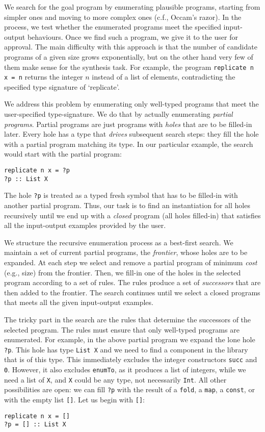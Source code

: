 We search for the goal program by enumerating plausible programs, starting from simpler ones and moving to more complex ones (c.f., Occam's razor).  In the process, we test whether the enumerated programs meet the specified input-output behaviours.  Once we find such a program, we give it to the user for approval.  The main difficulty with this approach is that the number of candidate programs of a given size grows exponentially, but on the other hand very few of them make sense for the synthesis task.  For example, the program \lstinline|replicate n x = n| returns the integer $n$ instead of a list of elements, contradicting the specified type signature of `replicate'.

We address this problem by enumerating only well-typed programs that meet the user-specified type-signature.  We do that by actually enumerating \emph{partial programs}.  Partial programs are just programs with \emph{holes} that are to be filled-in later.  Every hole has a type that \emph{drives} subsequent search steps: they fill the hole with a partial program matching its type.  In our particular example, the search would start with the partial program:
\begin{lstlisting}[style=plain]
replicate n x = ?p
?p :: List X
\end{lstlisting}
The hole \lstinline|?p| is treated as a typed fresh symbol that has to be filled-in with another partial program.  Thus, our task is to find an instantiation for all holes recursively until we end up with a \emph{closed} program (all holes filled-in) that satisfies all the input-output examples provided by the user.

We structure the recursive enumeration process as a best-first search.  We maintain a set of current partial programs, the \emph{frontier}, whose holes are to be expanded.  At each step we select and remove a partial program of minimum \emph{cost} (e.g., size) from the frontier.  Then, we fill-in one of the holes in the selected program according to a set of rules.  The rules produce a set of \emph{successors} that are then added to the frontier.  The search continues until we select a closed programs that meets all the given input-output examples.

The tricky part in the search are the rules that determine the successors of the selected program.  The rules must ensure that only well-typed programs are enumerated.  For example, in the above partial program we expand the lone hole \lstinline|?p|.  This hole has type \lstinline|List X| and we need to find a component in the library that is of this type.  This immediately excludes the integer constructors \lstinline|succ| and \lstinline|0|.  However, it also excludes \lstinline|enumTo|, as it produces a list of integers, while we need a list of \lstinline|X|, and \lstinline|X| could be any type, not necessarily \lstinline|Int|.  All other possibilities are open: we can fill \lstinline|?p| with the result of a \lstinline|fold|, a \lstinline|map|, a \lstinline|const|, or with the empty list \lstinline|[]|.  Let us begin with \lstinline|[]|:
\begin{lstlisting}[style=plain]
replicate n x = []
?p = [] :: List X
\end{lstlisting}

